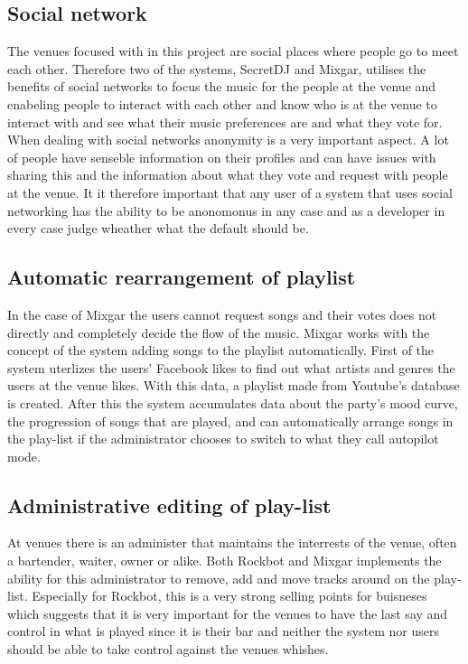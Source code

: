 \subsection{Social network}
The venues focused with in this project are social places where people go to meet each other. Therefore two of the systems, 
SecretDJ and Mixgar, utilises the benefits of social networks to focus the music for the people at the venue and enabeling people to interact with each other and know who is at the venue to interact with and see what their music preferences are and what they vote for.
When dealing with social networks anonymity is a very important aspect. A lot of people have senseble information on their profiles and can have issues with sharing this and the information about what they vote and request with people at the venue.
It it therefore important that any user of a system that uses social networking has the ability to be anonomonus in any case and as a developer in every case judge wheather what the default should be.

\subsection{Automatic rearrangement of playlist}
In the case of Mixgar the users cannot request songs and their votes does not directly and completely decide the flow of the music. Mixgar works with the concept of the system adding songs to the playlist automatically. First of the system uterlizes the users’ Facebook likes to find out what artists and genres the users at the venue likes. With this data, a playlist made from Youtube’s database is created. After this the system accumulates data about the party’s mood curve, the progression of songs that are played, and can automatically arrange songs in the play-list if the administrator chooses to switch to what they call autopilot mode.

\subsection{Administrative editing of play-list}
At venues there is an administer that maintains the interrests of the venue, often a bartender, waiter, owner or alike. Both Rockbot and Mixgar implements the ability for this administrator to remove, add and move tracks around on the play-list. Especially for Rockbot, this is a very strong selling points for buisneses which suggests that it is very important for the venues to have the last say and control in what is played since it is their bar and neither the system nor users should be able to take control against the venues whishes.

